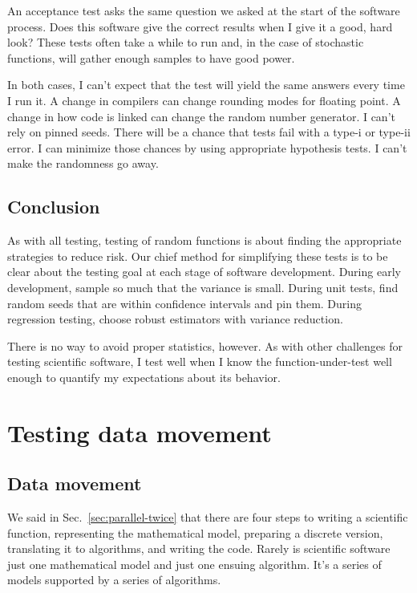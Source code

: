 \documentclass[fleqn,10pt]{olplainarticle}
\begin{document}
An acceptance test asks the same question we asked at the start of
the software process. Does this software give the correct results when
I give it a good, hard look? These tests often take a while to run and,
in the case of stochastic functions, will gather enough samples to have
good power.

In both cases, I can't expect that the test will yield the same answers
every time I run it. A change in compilers can change rounding modes
for floating point. A change in how code is linked can change the
random number generator. I can't rely on pinned seeds. There will
be a chance that tests fail with a type-i or type-ii error. I can minimize
those chances by using appropriate hypothesis tests. I can't make the
randomness go away.


\subsection{Conclusion}

As with all testing, testing of random functions is about finding the
appropriate strategies to reduce risk. Our chief method for simplifying
these tests is to be clear about the testing goal at each stage of
software development. During early development, sample so much that
the variance is small. During unit tests, find random seeds that are
within confidence intervals and pin them. During regression testing,
choose robust estimators with variance reduction.

There is no way to avoid proper statistics, however. As with other
challenges for testing scientific software, I test well when I know
the function-under-test well enough to quantify my expectations
about its behavior.



\section{Testing data movement}\label{sec:data-movement}

\subsection{Data movement}\label{sec:movement-movement}

We said in Sec.~\ref{sec:parallel-twice} that there are four
steps to writing a scientific function, representing the mathematical model,
preparing a discrete version, translating it to algorithms,
and writing the code.
Rarely is scientific software just one mathematical model
and just one ensuing algorithm. It's a series of models supported
by a series of algorithms.
\end{document}
